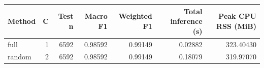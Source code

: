 \begin{tabular}{lrrrrrr}
\toprule
Method & C & Test n & Macro F1 & Weighted F1 & Total inference (s) & Peak CPU RSS (MiB) \\
\midrule
full & 1 & 6592 & 0.98592 & 0.99149 & 0.02882 & 323.40430 \\
random & 2 & 6592 & 0.98592 & 0.99149 & 0.18079 & 319.97070 \\
\bottomrule
\end{tabular}
